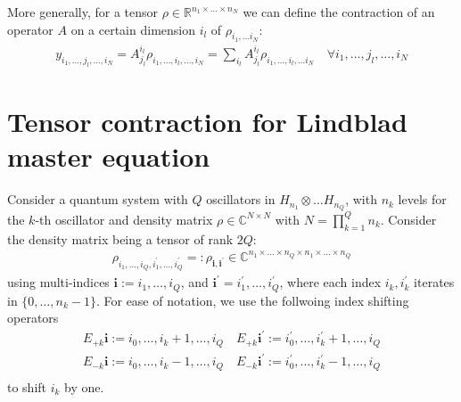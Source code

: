 \documentclass[letterpaper]{article}
\newcommand{\R}{\mathds{R}}
\newcommand{\C}{\mathds{C}}
\newcommand{\bfi}{\boldsymbol{i}}
\newcommand{\p}{\prime}
\begin{document}
More generally, for a tensor $\rho \in \R^{n_1\times \dots \times n_N}$ we can
define the contraction of an operator $A$ on a certain dimension $i_l$ of
$\rho_{i_1,\dots i_N}$:
\begin{align}
    y_{i_1,\dots,j_l,\dots,i_N} = A_{j_l}^{i_l} \rho_{i_1,\dots,i_l,\dots,i_N} =
    \sum_{i_l} A_{j_l}^{i_l} \rho_{i_1,\dots,i_l,\dots i_N} \quad \forall
    i_1,\dots, j_l,\dots,i_N
\end{align}



\section{Tensor contraction for Lindblad master equation}
Consider a quantum system with $Q$ oscillators in $H_{n_1} \otimes \dots
H_{n_Q}$, with $n_k$ levels for the $k$-th oscillator and density matrix $\rho
\in \C^{N\times N}$ with $N=\prod_{k=1}^{Q} n_k$. Consider the density matrix
being a tensor of rank $2Q$: 
\begin{align}
    \rho_{i_1,\dots, i_Q, i_1^{\prime}, \dots, i_Q^{\prime}} =: \rho_{\bfi,
    \bfi^\prime}\in\C^{n_1\times \dots \times n_Q \times n_1 \times \dots \times
    n_Q}
\end{align}
using multi-indices $\bfi := i_{1},\dots,i_{Q}$, and $\bfi^\prime = i_1^\prime,
\dots, i_Q^\prime$, where each index $i_k, i_k^\p$ iterates in
$\{0,\dots,n_k-1\}$. For ease of notation, we use the follwoing index shifting
operators 
\begin{align}
  E_{+k} \bfi := i_0,\dots, i_{k}+1, \dots, i_Q \quad E_{+k} \bfi^\prime :=
  i_0^\prime, \dots, i_k^\prime + 1, \dots, i_Q\\
  E_{-k} \bfi := i_0,\dots, i_{k}-1, \dots, i_Q \quad E_{-k} \bfi^\prime :=
  i_0^\prime, \dots, i_k^\prime - 1, \dots, i_Q\\
\end{align}
to shift $i_k$ by one. 
\end{document}

